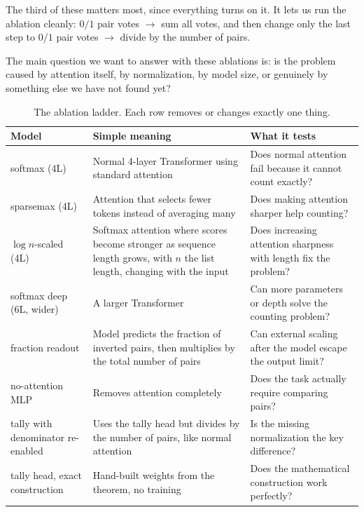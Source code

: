 \documentclass[10pt]{article}
\theoremstyle{definition}
\begin{document}
The third of these matters most, since everything turns on it. It lets us run the ablation cleanly: $0/1$ pair
votes $\rightarrow$ sum all votes, and then change only the last step to
$0/1$ pair votes $\rightarrow$ divide by the number of pairs.

\label{sec:ablation}

The main question we want to answer with these ablations is: is the
problem caused by attention itself, by normalization, by model size, or
genuinely by something else we have not found yet?

\begin{table}[htbp]
\centering
\caption{The ablation ladder. Each row removes or changes exactly one
thing.}
\label{tab:ablations}
\small
\begin{tabular}{@{}p{}p{}p{}@{}}
\toprule
\textbf{Model} & \textbf{Simple meaning} & \textbf{What it tests} \\
\midrule
softmax (4L) & Normal 4-layer Transformer using standard attention & Does normal attention fail because it cannot count exactly? \\
sparsemax (4L) & Attention that selects fewer tokens instead of averaging many & Does making attention sharper help counting? \\
$\log n$-scaled (4L) & Softmax attention where scores become stronger as sequence length grows, with $n$ the list length, changing with the input & Does increasing attention sharpness with length fix the problem? \\
softmax deep (6L, wider) & A larger Transformer & Can more parameters or depth solve the counting problem? \\
fraction readout & Model predicts the fraction of inverted pairs, then multiplies by the total number of pairs & Can external scaling after the model escape the output limit? \\
no-attention MLP & Removes attention completely & Does the task actually require comparing pairs? \\
tally with denominator re-enabled & Uses the tally head but divides by the number of pairs, like normal attention & Is the missing normalization the key difference? \\
tally head, exact construction & Hand-built weights from the theorem, no training & Does the mathematical construction work perfectly? \\
\bottomrule
\end{tabular}
\end{table}
\end{document}
